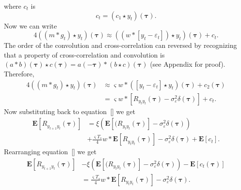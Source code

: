 \documentclass[conference]{IEEEtran}
\begin{document}
where $c_t$ is 
\begin{equation}
	c_t = (c_1 \star y_t)(\boldsymbol\tau).
\end{equation}
Now we can write
\begin{equation}
4((m \ast g_t) \star y_t)(\boldsymbol\tau) \approx (( w \ast \left[y_t-\varepsilon_t \right] ) \star y_t)(\boldsymbol\tau) + c_t.
\end{equation}
The order of the convolution and cross-correlation can reversed by recognizing that a property of cross-correlation and convolution is $(a \ast b)(\boldsymbol\tau) \star c(\boldsymbol\tau) = a(-\boldsymbol\tau)\ast(b \star c)(\boldsymbol\tau)$ (see Appendix for proof). Therefore,
\begin{align}
4((m \ast g_t) \star y_t)(\boldsymbol\tau) &\approx \varsigma w \ast (\left[y_t-\varepsilon_t \right]\star y_t ) (\boldsymbol\tau) + c_2(\boldsymbol\tau) \\ 
&= \varsigma w \ast \left[R_{y_ty_t}(\boldsymbol\tau) - \sigma_{\varepsilon}^2 \delta(\boldsymbol\tau) \right] + c_t.
\end{align}
Now substituting back to equation~\ref{} we get
\begin{align}
	\mathbf{E}[R_{y_{t+1}y_t}(\boldsymbol{\tau})] &= \xi\left(\mathbf{E}[ (R_{y_ty_t}(\boldsymbol{\tau})] - \sigma_{\varepsilon}^2 \delta(\boldsymbol{\tau})\right) \nonumber \\
	&+ \frac{\varsigma T_s}{4}w \ast \mathbf{E}\left[R_{y_ty_t}(\boldsymbol\tau)\right] - \sigma_{\varepsilon}^2 \delta(\boldsymbol\tau)  + \mathbf{E}\left[c_t\right].
\end{align}
Rearranging equation~\ref{} we get
\begin{align}
	\mathbf{E}[R_{y_{t+1}y_t}(\boldsymbol{\tau})] &- \xi\left(\mathbf{E}[ (R_{y_ty_t}(\boldsymbol{\tau})] - \sigma_{\varepsilon}^2 \delta(\boldsymbol{\tau})\right) - \mathbf{E}\left[c_t(\boldsymbol\tau)\right] \nonumber \\
	&= \frac{\varsigma T_s}{4}w \ast \mathbf{E}\left[R_{y_ty_t}(\boldsymbol\tau)\right] - \sigma_{\varepsilon}^2 \delta(\boldsymbol\tau).
\end{align}
\end{document}
